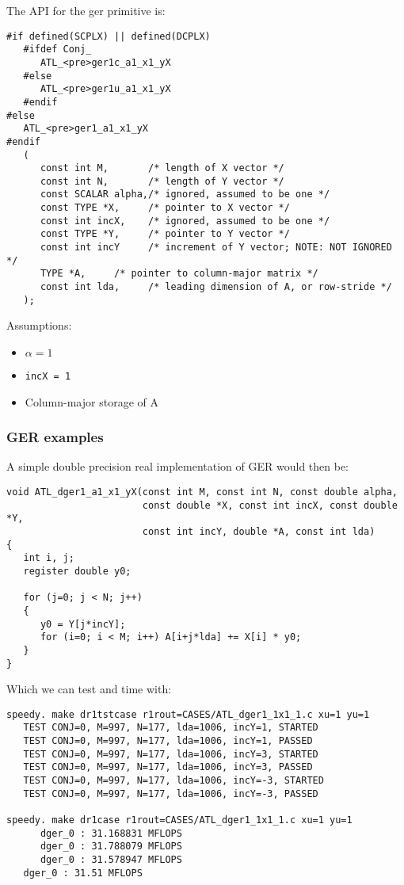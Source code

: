 \documentclass[11pt]{article}
\begin{document}
The API for the ger primitive is:
\begin{verbatim}
#if defined(SCPLX) || defined(DCPLX)
   #ifdef Conj_
      ATL_<pre>ger1c_a1_x1_yX
   #else
      ATL_<pre>ger1u_a1_x1_yX
   #endif
#else
   ATL_<pre>ger1_a1_x1_yX
#endif
   (
      const int M,       /* length of X vector */
      const int N,       /* length of Y vector */
      const SCALAR alpha,/* ignored, assumed to be one */
      const TYPE *X,     /* pointer to X vector */
      const int incX,    /* ignored, assumed to be one */
      const TYPE *Y,     /* pointer to Y vector */
      const int incY     /* increment of Y vector; NOTE: NOT IGNORED */
      TYPE *A,     /* pointer to column-major matrix */
      const int lda,     /* leading dimension of A, or row-stride */
   );
\end{verbatim}

Assumptions:
\begin{itemize}
 \item $\alpha = 1$
 \item \verb+incX = 1+
 \item Column-major storage of A
\end{itemize}

\subsubsection{GER examples}

A simple double precision real implementation of GER would then be:
\begin{verbatim}
void ATL_dger1_a1_x1_yX(const int M, const int N, const double alpha,
                        const double *X, const int incX, const double *Y,
                        const int incY, double *A, const int lda)
{
   int i, j;
   register double y0;

   for (j=0; j < N; j++)
   {
      y0 = Y[j*incY];
      for (i=0; i < M; i++) A[i+j*lda] += X[i] * y0;
   }
}
\end{verbatim}
Which we can test and time with:
\begin{verbatim}
speedy. make dr1tstcase r1rout=CASES/ATL_dger1_1x1_1.c xu=1 yu=1
   TEST CONJ=0, M=997, N=177, lda=1006, incY=1, STARTED
   TEST CONJ=0, M=997, N=177, lda=1006, incY=1, PASSED
   TEST CONJ=0, M=997, N=177, lda=1006, incY=3, STARTED
   TEST CONJ=0, M=997, N=177, lda=1006, incY=3, PASSED
   TEST CONJ=0, M=997, N=177, lda=1006, incY=-3, STARTED
   TEST CONJ=0, M=997, N=177, lda=1006, incY=-3, PASSED

speedy. make dr1case r1rout=CASES/ATL_dger1_1x1_1.c xu=1 yu=1
      dger_0 : 31.168831 MFLOPS
      dger_0 : 31.788079 MFLOPS
      dger_0 : 31.578947 MFLOPS
   dger_0 : 31.51 MFLOPS
\end{verbatim}
\end{document}
